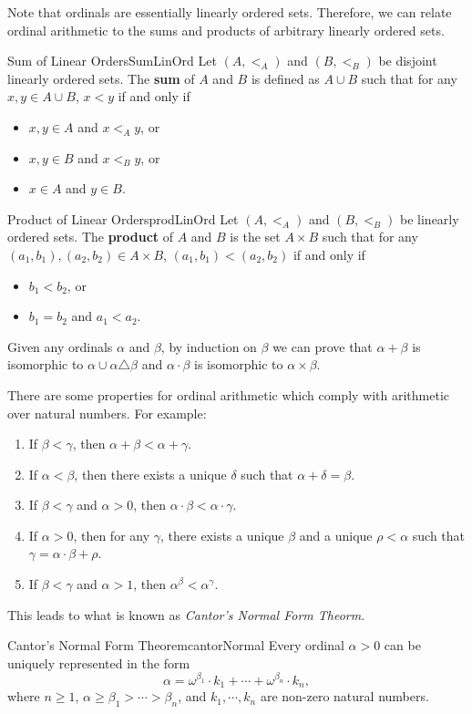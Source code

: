 \documentclass[math]{amznotes}
\theoremstyle{remark}
\begin{document}
Note that ordinals are essentially linearly ordered sets. Therefore, we can relate ordinal arithmetic to the sums and products of arbitrary linearly ordered sets.
\begin{dfnbox}{Sum of Linear Orders}{SumLinOrd}
    Let $(A, <_A)$ and $(B, <_B)$ be disjoint linearly ordered sets. The {\color{red} \textbf{sum}} of $A$ and $B$ is defined as $A \cup B$ such that for any $x, y \in A \cup B$, $x < y$ if and only if
    \begin{itemize}
        \item $x, y \in A$ and $x <_A y$, or
        \item $x, y \in B$ and $x <_B y$, or
        \item $x \in A$ and $y \in B$.
    \end{itemize}
\end{dfnbox}
\begin{dfnbox}{Product of Linear Orders}{prodLinOrd}
    Let $(A, <_A)$ and $(B, <_B)$ be linearly ordered sets. The {\color{red} \textbf{product}} of $A$ and $B$ is the set $A \times B$ such that for any $(a_1, b_1), (a_2, b_2) \in A \times B$, $(a_1, b_1) < (a_2, b_2)$ if and only if
    \begin{itemize}
        \item $b_1 < b_2$, or
        \item $b_1 = b_2$ and $a_1 < a_2$.
    \end{itemize}
\end{dfnbox}
Given any ordinals $\alpha$ and $\beta$, by induction on $\beta$ we can prove that $\alpha + \beta$ is isomorphic to $\alpha \cup \alpha \triangle \beta$ and $\alpha \cdot \beta$ is isomorphic to $\alpha \times \beta$.

There are some properties for ordinal arithmetic which comply with arithmetic over natural numbers. For example:
\begin{enumerate}
    \item If $\beta < \gamma$, then $\alpha + \beta < \alpha + \gamma$.
    \item If $\alpha < \beta$, then there exists a unique $\delta$ such that $\alpha + \delta = \beta$.
    \item If $\beta < \gamma$ and $\alpha > 0$, then $\alpha \cdot \beta < \alpha \cdot \gamma$.
    \item If $\alpha > 0$, then for any $\gamma$, there exists a unique $\beta$ and a unique $\rho < \alpha$ such that $\gamma = \alpha \cdot \beta + \rho$.
    \item If $\beta < \gamma$ and $\alpha > 1$, then $\alpha^\beta < \alpha^\gamma$.
\end{enumerate}
This leads to what is known as \textit{Cantor's Normal Form Theorm}.
\begin{thmbox}{Cantor's Normal Form Theorem}{cantorNormal}
    Every ordinal $\alpha > 0$ can be uniquely represented in the form
    \begin{equation*}
        \alpha = \omega^{\beta_1} \cdot k_1 + \cdots + \omega^{\beta_n} \cdot k_n,
    \end{equation*}
    where $n \geq 1$, $\alpha \geq \beta_1 > \cdots > \beta_n$, and $k_1, \cdots, k_n$ are non-zero natural numbers.
\end{thmbox}
\end{document}

